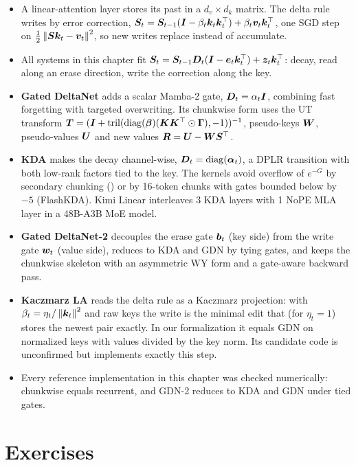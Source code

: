 \begin{summarybox}
\begin{itemize}
  \item A linear-attention layer stores its past in a $d_v\times d_k$ matrix. The delta rule writes
  by error correction, $\bm{S}_t = \bm{S}_{t-1}(\bm{I} - \beta_t\bm{k}_t\bm{k}_t^{\top}) + \beta_t\bm{v}_t\bm{k}_t^{\top}$, one SGD
  step on $\tfrac12\left\lVert \bm{S}\bm{k}_t - \bm{v}_t\right\rVert^2$, so new writes replace instead of accumulate.
  \item All systems in this chapter fit
  $\bm{S}_t = \bm{S}_{t-1}\bm{D}_t(\bm{I} - \bm{e}_t\bm{k}_t^{\top}) + \bm{z}_t\bm{k}_t^{\top}$: decay, read along an erase direction,
  write the correction along the key.
  \item \textbf{Gated DeltaNet} adds a scalar Mamba-2 gate, $\bm{D}_t = \alpha_t\bm{I}$, combining fast
  forgetting with targeted overwriting. Its chunkwise form uses the UT transform
  $\bm{T} = (\bm{I} + \operatorname{tril}(\operatorname{diag}(\bm{\beta})(\bm{K}\bm{K}^{\top}\odot\bm\Gamma),-1))^{-1}$, pseudo-keys
  $\bm{W}$, pseudo-values $\bm{U}$ and new values $\bm R = \bm{U} - \bm{W}\bm{S}^{\top}$.
  \item \textbf{KDA} makes the decay channel-wise, $\bm{D}_t = \operatorname{diag}(\bm{\alpha}_t)$, a DPLR transition with
  both low-rank factors tied to the key. The kernels avoid overflow of $e^{-G}$ by secondary
  chunking (\fla{}) or by 16-token chunks with gates bounded below by $-5$ (FlashKDA). Kimi Linear
  interleaves 3 KDA layers with 1 NoPE MLA layer in a 48B-A3B MoE model.
  \item \textbf{Gated DeltaNet-2} decouples the erase gate $\bm{b}_t$ (key side) from the write gate
  $\bm{w}_t$ (value side), reduces to KDA and GDN by tying gates, and keeps the chunkwise skeleton
  with an asymmetric WY form and a gate-aware backward pass.
  \item \textbf{Kaczmarz LA} reads the delta rule as a Kaczmarz projection: with
  $\beta_t = \eta_t/\left\lVert \bm{k}_t\right\rVert^2$ and raw keys the write is the minimal edit that (for $\eta_t = 1$)
  stores the newest pair exactly. In our formalization it equals GDN on normalized keys with values
  divided by the key norm. Its candidate code is unconfirmed but implements exactly this step.
  \item Every reference implementation in this chapter was checked numerically: chunkwise equals
  recurrent, and GDN-2 reduces to KDA and GDN under tied gates.
\end{itemize}
\end{summarybox}

\section*{Exercises}

